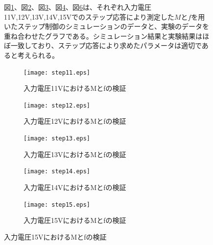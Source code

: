 \documentclass[a4j,11pt,twoside]{ujbook}
\begin{document}
\begin{figure}[htbp]
\begin{center}
	図\ref{fig:step11}、図\ref{fig:step12}、図\ref{fig:step13}、図\ref{fig:step14}、図\ref{fig:step15}は、それぞれ入力電圧11V,12V,13V,14V,15Vでのステップ応答により測定した$M$と$f$を用いたステップ制御のシミュレーションのデータと、実験のデータを重ね合わせたグラフである。シミュレーション結果と実験結果はほぼ一致しており、ステップ応答により求めたパラメータは適切であると考えられる。

	\begin{figure}[htbp]
		\begin{center}
			\texttt{[image: step11.eps]}
			\caption{入力電圧11VにおけるMとfの検証}
			\label{fig:step11}
		\end{center}
	\end{figure}

	\begin{figure}[htbp]
		\begin{center}
			\texttt{[image: step12.eps]}
			\caption{入力電圧12VにおけるMとfの検証}
			\label{fig:step12}
		\end{center}
	\end{figure}
	
	\begin{figure}[htbp]
		\begin{center}
			\texttt{[image: step13.eps]}
			\caption{入力電圧13VにおけるMとfの検証}
			\label{fig:step13}
		\end{center}
	\end{figure}
	
	\begin{figure}[htbp]
		\begin{center}
			\texttt{[image: step14.eps]}
			\caption{入力電圧14VにおけるMとfの検証}
			\label{fig:step14}
		\end{center}
	\end{figure}
	
	\begin{figure}[htbp]
		\begin{center}
			\texttt{[image: step15.eps]}
			\caption{入力電圧15VにおけるMとfの検証}
			\label{fig:step15}
		\end{center}
	\end{figure}
	
	

\end{center}
\end{figure}
\end{document}

